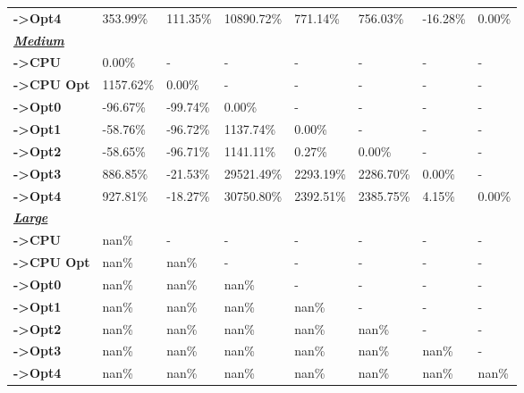 \begin{table}[H]
\begin{tabular}{llllllll}
    \rowcolor[HTML]{EFEFEF} \cellcolor[HTML]{DAE8FC} \textbf{->Opt4} & 353.99\% & 111.35\% & 10890.72\% & 771.14\% & 756.03\% & 	-16.28\% & 	0.00\% \\
    \cellcolor[HTML]{DAE8FC} \textbf{\textbf{{\emph{{\underline{{Medium}}}}}}} &  &  &  &  &  &  &  \\
    \rowcolor[HTML]{EFEFEF} \cellcolor[HTML]{DAE8FC} \textbf{->CPU} & 0.00\% & - & - & - & - & - & - \\
    \cellcolor[HTML]{DAE8FC} \textbf{->CPU Opt} & 1157.62\% & 0.00\% & - & - & - & - & - \\
    \rowcolor[HTML]{EFEFEF} \cellcolor[HTML]{DAE8FC} \textbf{->Opt0} & -96.67\% & -99.74\% & 0.00\% & - & - & - & - \\
    \cellcolor[HTML]{DAE8FC} \textbf{->Opt1} & -58.76\% & -96.72\% & 1137.74\% & 0.00\% & - & - & - \\
    \rowcolor[HTML]{EFEFEF} \cellcolor[HTML]{DAE8FC} \textbf{->Opt2} & -58.65\% & -96.71\% & 1141.11\% & 0.27\% & 0.00\% & - & - \\
    \cellcolor[HTML]{DAE8FC} \textbf{->Opt3} & 886.85\% & -21.53\% & 29521.49\% & 2293.19\% & 2286.70\% & 	0.00\% & - \\
    \rowcolor[HTML]{EFEFEF} \cellcolor[HTML]{DAE8FC} \textbf{->Opt4} & 927.81\% & -18.27\% & 30750.80\% & 2392.51\% & 2385.75\% & 	4.15\% & 	0.00\% \\
    \cellcolor[HTML]{DAE8FC} \textbf{\textbf{{\emph{{\underline{{Large}}}}}}} &  &  &  &  &  &  &  \\
    \rowcolor[HTML]{EFEFEF} \cellcolor[HTML]{DAE8FC} \textbf{->CPU} & nan\% & - & - & - & - & - & - \\
    \cellcolor[HTML]{DAE8FC} \textbf{->CPU Opt} & nan\% & nan\% & - & - & - & - & - \\
    \rowcolor[HTML]{EFEFEF} \cellcolor[HTML]{DAE8FC} \textbf{->Opt0} & nan\% & nan\% & nan\% & - & - & - & - \\
    \cellcolor[HTML]{DAE8FC} \textbf{->Opt1} & nan\% & nan\% & nan\% & nan\% & - & - & - \\
    \rowcolor[HTML]{EFEFEF} \cellcolor[HTML]{DAE8FC} \textbf{->Opt2} & nan\% & nan\% & nan\% & nan\% & nan\% & - & - \\
    \cellcolor[HTML]{DAE8FC} \textbf{->Opt3} & nan\% & nan\% & nan\% & nan\% & nan\% & 	nan\% & - \\
    \rowcolor[HTML]{EFEFEF} \cellcolor[HTML]{DAE8FC} \textbf{->Opt4} & nan\% & nan\% & nan\% & nan\% & nan\% & 	nan\% & 	nan\% \\

\end{tabular}
\end{table}
